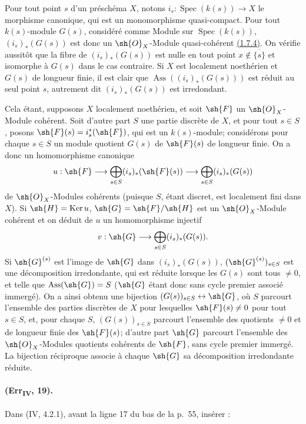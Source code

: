 \begin{remark}[3.2.9]
\label{IV.3.2.9}
Pour tout point $s$ d'un préschéma $X$, notons
$i_s:\operatorname{Spec}(k(s))\to X$ le morphisme canonique, qui est
un monomorphisme quasi-compact. Pour tout $k(s)$-module $G(s)$,
considéré comme Module sur $\operatorname{Spec}(k(s))$,
$(i_s)_*(G(s))$ est donc un $\sh{O}_X$-Module quasi-cohérent
{\hyperref[canon-index.ega4.c04.statement.1-7-4]{(1.7.4)}}. On vérifie aussitôt
que la fibre de $(i_s)_*(G(s))$ est nulle en tout point
$x\notin\overline{\{s\}}$ et isomorphe à $G(s)$ dans le cas contraire.
Si $X$ est localement noethérien et $G(s)$ de longueur finie, il est
clair que $\operatorname{Ass}((i_s)_*(G(s)))$ est réduit au seul point
$s$, autrement dit $(i_s)_*(G(s))$ est irredondant.

Cela étant, supposons $X$ localement noethérien, et soit $\sh{F}$ un
$\sh{O}_X$-Module cohérent. Soit d'autre part $S$ une partie discrète
de $X$, et pour tout $s\in S$, posons
$\sh{F}(s)=i_s^*(\sh{F})$, qui est un $k(s)$-module; considérons pour
chaque $s\in S$ un module quotient $G(s)$ de $\sh{F}(s)$ de longueur
finie. On a donc un homomorphisme canonique
\[
 u:\sh{F}\longrightarrow
 \bigoplus_{s\in S}(i_s)_*(\sh{F}(s))\longrightarrow
 \bigoplus_{s\in S}(i_s)_*(G(s))
\]
de $\sh{O}_X$-Modules cohérents (puisque $S$, étant discret, est
localement fini dans $X$). Si $\sh{H}=\operatorname{Ker}u$,
$\sh{G}=\sh{F}/\sh{H}$ est un $\sh{O}_X$-Module cohérent et on déduit
de $u$ un homomorphisme injectif
\[
 v:\sh{G}\longrightarrow\bigoplus_{s\in S}(i_s)_*(G(s)).
\]
Si $\sh{G}^{(s)}$ est l'image de $\sh{G}$ dans $(i_s)_*(G(s))$,
$(\sh{G}^{(s)})_{s\in S}$ est une décomposition irredondante, qui est
réduite lorsque les $G(s)$ sont tous $\neq0$, et telle que
$\operatorname{Ass}(\sh{G})=S$ ($\sh{G}$ étant donc sans cycle premier
associé immergé). On a ainsi obtenu une bijection
$(G(s))_{s\in S}\leftrightarrow\sh{G}$, où $S$ parcourt l'ensemble des
parties discrètes de $X$ pour lesquelles $\sh{F}(s)\neq0$ pour tout
$s\in S$, et, pour chaque $S$, $(G(s))_{s\in S}$ parcourt l'ensemble
des quotients $\neq0$ et de longueur finie des $\sh{F}(s)$; d'autre
part $\sh{G}$ parcourt l'ensemble des $\sh{O}_X$-Modules quotients
cohérents de $\sh{F}$, sans cycle premier immergé. La bijection
réciproque associe à chaque $\sh{G}$ sa décomposition irredondante
réduite.
\end{remark}

\paragraph{(Err\textsubscript{IV}, 19).}
Dans (IV, 4.2.1), avant la ligne 17 du bas de la p.~55, insérer :

